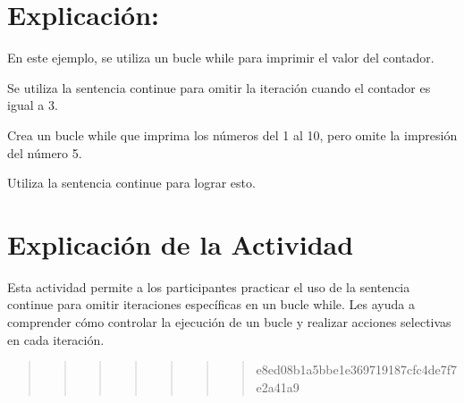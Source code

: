 \documentclass[
  a4paper,
  onepage,
  openany]{scrreprt}
\begin{document}
\hypertarget{explicaciuxf3n-41}{%
\section{Explicación:}\label{explicaciuxf3n-41}}

En este ejemplo, se utiliza un bucle while para imprimir el valor del
contador.

Se utiliza la sentencia continue para omitir la iteración cuando el
contador es igual a 3.

\begin{tcolorbox}[enhanced jigsaw, breakable, opacityback=0, toptitle=1mm, coltitle=black, toprule=.15mm, rightrule=.15mm, colframe=quarto-callout-important-color-frame, opacitybacktitle=0.6, arc=.35mm, title=\textcolor{quarto-callout-important-color}{\faExclamation}\hspace{0.5em}{Actividad Práctica:}, titlerule=0mm, colbacktitle=quarto-callout-important-color!10!white, bottomtitle=1mm, bottomrule=.15mm, colback=white, left=2mm, leftrule=.75mm]

Crea un bucle while que imprima los números del 1 al 10, pero omite la
impresión del número 5.

Utiliza la sentencia continue para lograr esto.

\end{tcolorbox}

\hypertarget{explicaciuxf3n-de-la-actividad-39}{%
\section{Explicación de la
Actividad}\label{explicaciuxf3n-de-la-actividad-39}}

Esta actividad permite a los participantes practicar el uso de la
sentencia continue para omitir iteraciones específicas en un bucle
while. Les ayuda a comprender cómo controlar la ejecución de un bucle y
realizar acciones selectivas en cada iteración.

\begin{quote}
\begin{quote}
\begin{quote}
\begin{quote}
\begin{quote}
\begin{quote}
\begin{quote}
e8ed08b1a5bbe1e369719187cfc4de7f7e2a41a9
\end{quote}
\end{quote}
\end{quote}
\end{quote}
\end{quote}
\end{quote}
\end{quote}
\end{document}
